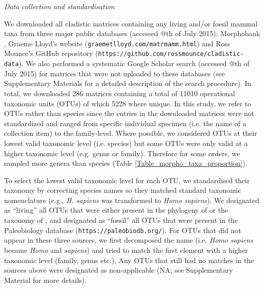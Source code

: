 \documentclass[12pt,letterpaper]{article}
\renewcommand{\subsection}[1]{%
\bigskip
\begin{center}
\begin{large}
\normalfont\itshape #1
\end{large}
\end{center}}
\begin{document}
\subsection{Data collection and standardisation}
We downloaded all cladistic matrices containing any living and/or fossil mammal taxa from three major public databases (accessed @th of July 2015): Morphobank \citep[\texttt{http://www.morphobank.org/};][]{morphobank}, Graeme Lloyd's website (\texttt{graemetlloyd.com/matrmamm.html}) and Ross Mounce's GitHub repository (\texttt{https://github.com/rossmounce/cladistic-data}).
We also performed a systematic Google Scholar search (accessed @th of July 2015) for matrices that were not uploaded to these databases (see Supplementary Materials for a detailed description of the search procedure).
In total, we downloaded 286 matrices containing a total of 11010 operational taxonomic units (OTUs) of which 5228 where unique. %
In this study, we refer to OTUs rather than species since the entries in the downloaded matrices were not standardized and ranged from specific individual specimen (i.e. the name of a collection item) to the family-level.
Where possible, we considered OTUs at their lowest valid taxonomic level (i.e. species) but some OTUs were only valid at a higher taxonomic level (e.g. genus or family).
Therefore for some orders, we sampled more genera than species (Table \ref{Table_morpho_taxa_proportion}).

To select the lowest valid taxonomic level for each OTU, we standardised their taxonomy by correcting species names so they matched standard taxonomic nomenclature (e.g., \textit{H. sapiens} was transformed to \textit{Homo sapiens}).
We designated as ``living'' all OTUs that were either present in the phylogeny of \citet{BinindaEmonds} or the taxonomy of \citet{wilson2005mammal}, and designated as ``fossil'' all OTUs that were present in the Paleobiology database (\texttt{https://paleobiodb.org/}).
For OTUs that did not appear in these three sources, we first decomposed the name (i.e. \textit{Homo sapiens} became \textit{Homo} and \textit{sapiens}) and tried to match the first element with a higher taxonomic level (family, genus etc.).
Any OTUs that still had no matches in the sources above were designated as non-applicable (NA; see Supplementary Material for more details).
\end{document}
